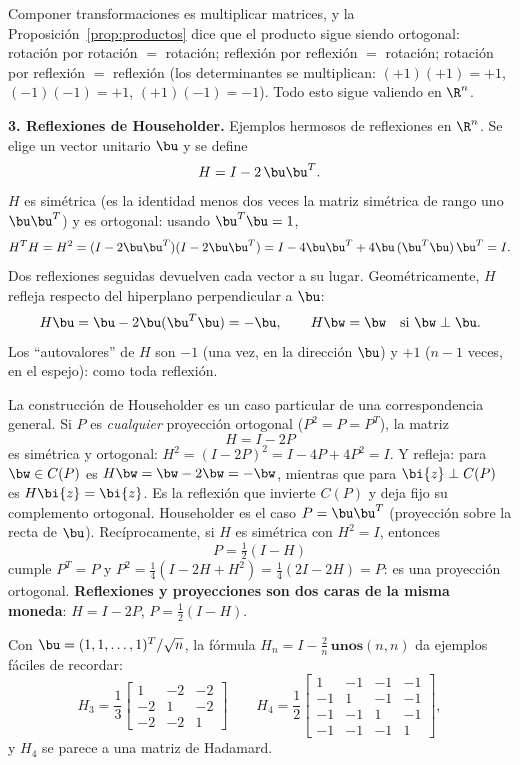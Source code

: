 Componer transformaciones es multiplicar matrices, y la
Proposición~\ref{prop:productos} dice que el producto sigue siendo
ortogonal: rotación por rotación $=$ rotación; reflexión por reflexión $=$
rotación; rotación por reflexión $=$ reflexión (los determinantes se
multiplican: $(+1)(+1)=+1$, $(-1)(-1)=+1$, $(+1)(-1)=-1$). Todo esto sigue
valiendo en $\R^n$.

\textbf{3. Reflexiones de Householder.} Ejemplos hermosos de reflexiones en
$\R^n$. Se elige un vector unitario $\bu$ y se define
\begin{equation}\label{eq:householder}
H=I-2\,\bu\bu^T .
\end{equation}
$H$ es simétrica (es la identidad menos dos veces la matriz simétrica de
rango uno $\bu\bu^T$) y es ortogonal: usando $\bu^T\bu=1$,
\[
H^T H=H^2=(I-2\bu\bu^T)(I-2\bu\bu^T)
=I-4\bu\bu^T+4\bu\,(\bu^T\bu)\,\bu^T=I .
\]
Dos reflexiones seguidas devuelven cada vector a su lugar. Geométricamente,
$H$ refleja respecto del hiperplano perpendicular a $\bu$:
\[
H\bu=\bu-2\bu(\bu^T\bu)=-\bu ,
\qquad
H\bw=\bw \quad\text{si } \bw\perp\bu .
\]
Los ``autovalores'' de $H$ son $-1$ (una vez, en la dirección $\bu$) y $+1$
($n-1$ veces, en el espejo): como toda reflexión.

\begin{observacion}
\label{obs:reflexion-proyeccion}
La construcción de Householder es un caso particular de una
correspondencia general. Si $P$ es \emph{cualquier} proyección ortogonal
($P^2=P=P^T$), la matriz
\[
H=I-2P
\]
es simétrica y ortogonal:
$H^2=(I-2P)^2=I-4P+4P^2=I$. Y refleja: para $\bw\in C(P)$ es
$H\bw=\bw-2\bw=-\bw$, mientras que para $\bi{z}\perp C(P)$ es
$H\bi{z}=\bi{z}$. Es la reflexión que invierte $C(P)$ y deja fijo su
complemento ortogonal. Householder es el caso $P=\bu\bu^T$
(proyección sobre la recta de $\bu$). Recíprocamente, si $H$ es simétrica
con $H^2=I$, entonces
\[
P=\tfrac12(I-H)
\]
cumple $P^T=P$ y
$P^2=\tfrac14(I-2H+H^2)=\tfrac14(2I-2H)=P$: es una proyección ortogonal.
\textbf{Reflexiones y proyecciones son dos caras de la misma moneda}:
$H=I-2P$, $P=\tfrac12(I-H)$.
\end{observacion}

Con $\bu=(1,1,\dots,1)^T/\sqrt n$, la fórmula
$H_n=I-\frac{2}{n}\,\textbf{unos}(n,n)$ da ejemplos fáciles de recordar:
\[
H_3=\frac13\begin{bmatrix}1&-2&-2\\-2&1&-2\\-2&-2&1\end{bmatrix}
\qquad
H_4=\frac12\begin{bmatrix}1&-1&-1&-1\\-1&1&-1&-1\\-1&-1&1&-1\\
-1&-1&-1&1\end{bmatrix},
\]
y $H_4$ se parece a una matriz de Hadamard.

